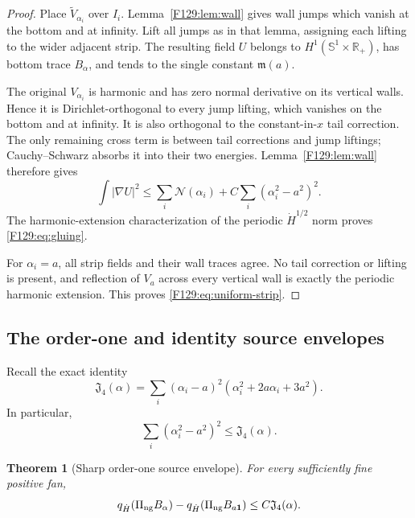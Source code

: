 \documentclass[11pt]{amsart}
\numberwithin{equation}{section}
\newtheorem{theorem}{Theorem}[section]
\theoremstyle{definition}
\theoremstyle{remark}
\newcommand{\Sone}{\mathbb S^1}
\newcommand{\PiNG}{\Pi_{\rm ng}}
\newcommand{\Jfour}{\mathfrak J_4}
\newcommand{\qdot}{q_{\dot H}}
\begin{document}
\begin{proof}
Place \(\widetilde V_{\alpha_i}\) over \(I_i\).  Lemma~\ref{F129:lem:wall}
gives wall jumps which vanish at the bottom and at infinity.  Lift all
jumps as in that lemma, assigning each lifting to the wider adjacent strip.
The resulting field \(U\) belongs to
\(H^1(\Sone\times\mathbb R_+)\), has bottom trace \(B_\alpha\), and tends
to the single constant \(\mathfrak m(a)\).

The original \(V_{\alpha_i}\) is harmonic and has zero normal derivative
on its vertical walls.  Hence it is Dirichlet-orthogonal to every jump
lifting, which vanishes on the bottom and at infinity.  It is also
orthogonal to the constant-in-\(x\) tail correction.  The only remaining
cross term is between tail corrections and jump liftings; Cauchy--Schwarz
absorbs it into their two energies.  Lemma~\ref{F129:lem:wall} therefore gives
\begin{equation}
 \int|\nabla U|^2
 \le\sum_i\mathcal N(\alpha_i)
 +C\sum_i(\alpha_i^2-a^2)^2.
\end{equation}
The harmonic-extension characterization of the periodic
\(\dot H^{1/2}\) norm proves \eqref{F129:eq:gluing}.

For \(\alpha_i=a\), all strip fields and their wall traces agree.  No tail
correction or lifting is present, and reflection of \(V_a\) across every
vertical wall is exactly the periodic harmonic extension.  This proves
\eqref{F129:eq:uniform-strip}.
\end{proof}

\subsection{The order-one and identity source envelopes}

Recall the exact identity
\begin{equation}\label{F129:eq:Jidentity}
 \Jfour(\alpha)
 =\sum_i(\alpha_i-a)^2
   (\alpha_i^2+2a\alpha_i+3a^2).
\end{equation}
In particular,
\begin{equation}\label{F129:eq:square-charge}
 \sum_i(\alpha_i^2-a^2)^2
 \le\Jfour(\alpha).
\end{equation}

\begin{theorem}[Sharp order-one source envelope]\label{F129:thm:qdot}
For every sufficiently fine positive fan,
\begin{equation}\label{F129:eq:qdot-envelope}
 \qdot(\PiNG B_\alpha)-\qdot(\PiNG B_{a\mathbf1})
 \le C\Jfour(\alpha).
\end{equation}
\end{theorem}
\end{document}

